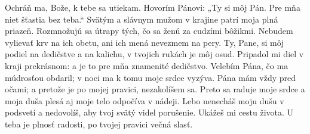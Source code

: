 Ochráň ma, Bože, k tebe sa utiekam.
Hovorím Pánovi: „Ty si môj Pán.
Pre mňa niet šťastia bez teba.“
\versseparator
Svätým a slávnym mužom v krajine
patrí moja plná priazeň.
\versseparator
Rozmnožujú sa útrapy tých, čo sa ženú za cudzími bôžikmi.
\versseparator
Nebudem vylievať krv na ich obetu,
ani ich mená nevezmem na pery.
\versseparator
Ty, Pane, si môj podiel na dedičstve a na kalichu,
v tvojich rukách je môj osud.
\versseparator
Pripadol mi diel v kraji prekrásnom:
a je to pre mňa znamenité dedičstvo.
\versseparator
Velebím Pána, čo ma múdrosťou obdaril;
v noci ma k tomu moje srdce vyzýva.
\versseparator
Pána mám vždy pred očami;
a pretože je po mojej pravici, nezakolíšem sa.
\versseparator
Preto sa raduje moje srdce
a moja duša plesá
aj moje telo odpočíva v nádeji.
\versseparator
Lebo nenecháš moju dušu v podsvetí
a nedovolíš, aby tvoj svätý videl porušenie.
\versseparator
Ukážeš mi cestu života.
U teba je plnosť radosti,
po tvojej pravici večná slasť.
